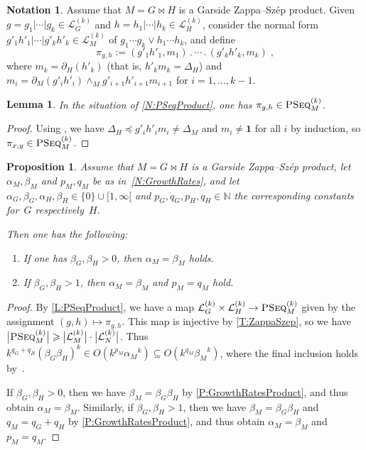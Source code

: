 \documentclass[a4paper,final]{article}
\let\ge\geqslant
\let\zs=\bowtie
\theoremstyle{plain}
\newtheorem{lemma}[lemma]{Lemma}
\newtheorem{proposition}[proposition]{Proposition}
\theoremstyle{remark}
\theoremstyle{definition}
\newtheorem{notation}[notation]{Notation}
\begin{document}
\begin{notation}\label{N:PSeqProduct}
Assume that $M=G\zs H$ is a Garside {Zappa--Sz{\'e}p}{} product.  Given $g=g_1|\cdots| g_k\in {\mathcal{L}}_G^{(k)}$ and $h=h_1|\cdots |h_k\in {\mathcal{L}}_H^{(k)}$,
consider the normal form $g'_1 h'_1|\cdots| g'_k h'_k \in {\mathcal{L}}_M^{(k)}$ of
$g_1\cdots g_k {\vee} h_1\cdots h_k$,
and define
\[
   \pi_{g,h} := (g'_1 h'_1, m_1){\mathbin{.}}\cdots{\mathbin{.}} (g'_k h'_k, m_k)
   \;,
\]
where $m_k=\partial_H(h'_k)$ (that is, $h'_k m_k=\Delta_H$) and $m_i = \partial_M(g'_i h'_i) \wedge_M g'_{i+1} h'_{i+1} m_{i+1}$ for $i=1,\ldots,k-1$.
\end{notation}

\begin{lemma}\label{L:PSeqProduct}
In the situation of \autoref{N:PSeqProduct}, one has $\pi_{g,h} \in {\textsc{PSeq}}_M^{(k)}$.
\end{lemma}
\begin{proof}
Using \cite[Lemma~39]{Zappa-Szep}, we have $\Delta_H {\preccurlyeq} g'_i h'_i m_i \neq \Delta_M$ and $m_i\ne {\mathbf{1}}$ for all $i$ by induction, so $\pi_{x,y}\in{\textsc{PSeq}}_M^{(k)}$.
\end{proof}

\begin{proposition}\label{P:PSeqProduct}
Assume that $M=G\zs H$ is a Garside {Zappa--Sz{\'e}p}{} product, let $\alpha_M,\beta_M$ and $p_M,q_M$ be as in~\autoref{N:GrowthRates}, and let $\alpha_G,\beta_G,\alpha_H,\beta_H\in\{0\}\cup[1,\infty[$ and $p_G,q_G,p_H,q_H\in{\mathbb{N}}$ the corresponding constants for~$G$ respectively~$H$.

Then one has the following:
\begin{enumerate} \itemsep 0em \vspace{-0.5\topskip}
\item If one has $\beta_G,\beta_H>0$, then $\alpha_M=\beta_M$ holds.
\item If $\beta_G,\beta_H>1$, then $\alpha_M=\beta_M$ and $p_M=q_M$ hold.
\end{enumerate}
\end{proposition}
\begin{proof}
By \autoref{L:PSeqProduct}, we have a map ${\mathcal{L}}_G^{(k)} \times {\mathcal{L}}_H^{(k)} \to {\textsc{PSeq}}_M^{(k)}$ given by the assignment $(g,h)\mapsto \pi_{g,h}$.
This map is injective by \autoref{T:ZappaSzep}, so we have
$\big|{\textsc{PSeq}}_M^{(k)}\big| \ge \big|{\mathcal{L}}_M^{(k)}\big| \cdot \big|{\mathcal{L}}_N^{(k)}\big|$.
Thus $k^{q_G+q_H} (\beta_G\beta_H)^k \in O(k^{p_M} {\alpha_M}^k) \subseteq O(k^{q_M} {\beta_M}^k)$, where the final inclusion holds by~\cite[Corollary~4.4]{GT13}.

If $\beta_G,\beta_H>0$, then we have $\beta_M=\beta_G\beta_H$ by \autoref{P:GrowthRatesProduct}, and thus obtain $\alpha_M=\beta_M$.
Similarly, if $\beta_G,\beta_H>1$, then we have $\beta_M=\beta_G\beta_H$ and $q_M=q_G+q_H$ by \autoref{P:GrowthRatesProduct}, and thus obtain $\alpha_M=\beta_M$ and $p_M=q_M$.
\end{proof}
\end{document}
